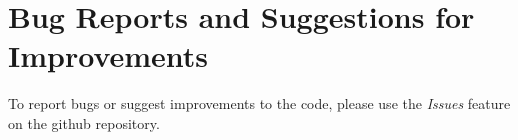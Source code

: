 \chapter*{Bug Reports and Suggestions for Improvements}\label{cha:Bug-Reports-and}

To report bugs or suggest improvements to the code, please use the {\it Issues} feature on the github repository.

